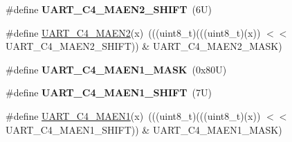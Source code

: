 \begin{DoxyCompactItemize}
\#define {\bfseries U\+A\+R\+T\+\_\+\+C4\+\_\+\+M\+A\+E\+N2\+\_\+\+S\+H\+I\+FT}~(6\+U)
\item 
\#define \mbox{\hyperlink{group___u_a_r_t___register___masks_gab2614230f0e93d3d59cf0c644411be46}{U\+A\+R\+T\+\_\+\+C4\+\_\+\+M\+A\+E\+N2}}(x)~(((uint8\+\_\+t)(((uint8\+\_\+t)(x)) $<$$<$ U\+A\+R\+T\+\_\+\+C4\+\_\+\+M\+A\+E\+N2\+\_\+\+S\+H\+I\+FT)) \& U\+A\+R\+T\+\_\+\+C4\+\_\+\+M\+A\+E\+N2\+\_\+\+M\+A\+SK)
\item 
\mbox{\label{group___u_a_r_t___register___masks_gaa345d5da303c56b2881394dc0e003337}} 
\#define {\bfseries U\+A\+R\+T\+\_\+\+C4\+\_\+\+M\+A\+E\+N1\+\_\+\+M\+A\+SK}~(0x80\+U)
\item 
\mbox{\label{group___u_a_r_t___register___masks_ga28655a6deae1adc48798c91db8ce24e1}} 
\#define {\bfseries U\+A\+R\+T\+\_\+\+C4\+\_\+\+M\+A\+E\+N1\+\_\+\+S\+H\+I\+FT}~(7\+U)
\item 
\#define \mbox{\hyperlink{group___u_a_r_t___register___masks_gafa848be1edfc0802b6988e09a2b7a3a4}{U\+A\+R\+T\+\_\+\+C4\+\_\+\+M\+A\+E\+N1}}(x)~(((uint8\+\_\+t)(((uint8\+\_\+t)(x)) $<$$<$ U\+A\+R\+T\+\_\+\+C4\+\_\+\+M\+A\+E\+N1\+\_\+\+S\+H\+I\+FT)) \& U\+A\+R\+T\+\_\+\+C4\+\_\+\+M\+A\+E\+N1\+\_\+\+M\+A\+SK)
\end{DoxyCompactItemize}
